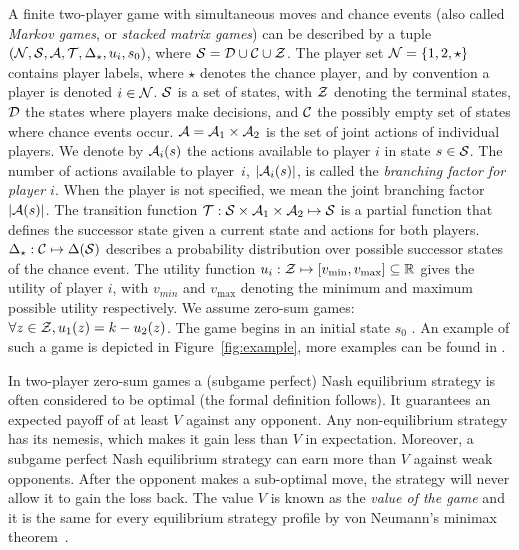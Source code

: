 A finite two-player game with simultaneous moves and chance events (also called \emph{Markov games}, or \emph{stacked matrix games}) can be described
by a tuple $(\mathcal{N}, \mathcal{S}, \mathcal{A}, \mathcal{T}, \Delta_\star, u_i, s_0)$, where $\mathcal{S} = \mathcal{D}\cup\mathcal{C}\cup\mathcal{Z}$.
The player set $\mathcal{N} = \{ 1, 2, \star \}$ contains player labels, where
$\star$ denotes the chance player, and by convention a player is denoted $i \in \mathcal{N}$.
$\mathcal{S}$ is a set of states, with $\mathcal{Z}$ denoting the terminal states, $\mathcal{D}$ the states where players make decisions,
and $\mathcal{C}$ the possibly empty set of states where chance events occur. $\mathcal{A} = \mathcal{A}_1 \times \mathcal{A}_2$ is the set of
joint actions of individual players. 
We denote by $\mathcal{A}_i(s)$ the actions available to player $i$ in state $s \in \mathcal{S}$. 
The number of actions available to player~$i$, $|\mathcal{A}_i(s)|$, is called the \emph{branching factor for player $i$}. 
When the player is not specified, we mean the joint branching factor $|\mathcal{A}(s)|$.
The transition function $\mathcal{T} : \mathcal{S} \times \mathcal{A}_1 \times \mathcal{A}_2 \mapsto \mathcal{S}$ is a partial function that defines the successor state given a current
state and actions for both players. $\Delta_\star:\mathcal{C} \mapsto \Delta(\mathcal{S})$ describes a probability distribution over
possible successor states of the chance event.
The utility function $u_i : \mathcal{Z} \mapsto [v_{\min}, v_{\max}] \subseteq \mathbb{R}$ gives the utility of player $i$, with
$v_{min}$ and $v_{\max}$ denoting the minimum and maximum possible utility respectively. We assume zero-sum
games: $\forall z \in \mathcal{Z}, u_1(z) = k - u_2(z)$. 
The game begins in an initial state $s_0$ .
An example of such a game is depicted in Figure~\ref{fig:example}, more examples can be found in \cite[Chapter 5]{Saffidine2013thesis}.

In two-player zero-sum games a (subgame perfect) Nash equilibrium strategy is often considered to be optimal (the formal definition follows).
It guarantees an expected payoff of at least $V$ against any opponent. Any non-equilibrium strategy has its nemesis, which makes it gain less
than $V$ in expectation. Moreover, a subgame perfect Nash equilibrium strategy can earn more than $V$ against weak opponents. After the
opponent makes a sub-optimal move, the strategy will never allow it to gain the loss back.
The value $V$ is known as the \emph{value of the game} and it is the same for every equilibrium strategy profile by von Neumann's minimax theorem~\cite{VonNeumann1928}.

